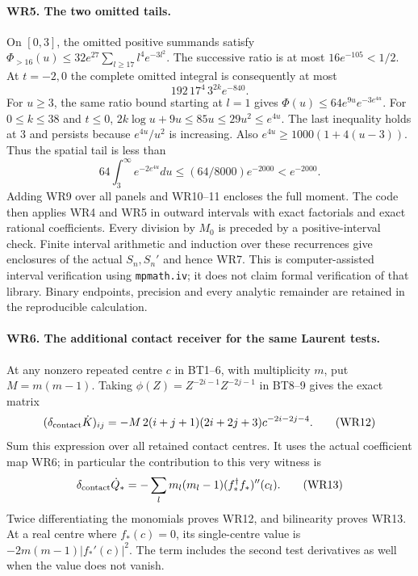 \documentclass[11pt,a4paper]{article}
\theoremstyle{definition}\newtheorem{definition}[theorem]{Definition}
\begin{document}
\paragraph{WR5. The two omitted tails.}
On $[0,3]$, the omitted positive summands satisfy
$\Phi_{>16}(u)\le32e^{27}\sum_{l\ge17}l^4e^{-3l^2}$.
The successive ratio is at most $16e^{-105}<1/2$. At $t=-2,0$
the complete omitted integral is consequently at most
\[
 192\,17^4\,3^{2k}e^{-840}.
 \tag{WR10}
\]
For $u\ge3$, the same ratio bound starting at $l=1$ gives
$\Phi(u)\le64e^{9u}e^{-3e^{4u}}$.
For $0\le k\le38$ and $t\le0$,
$2k\log u+9u\le85u\le29u^2\le e^{4u}$.
The last inequality holds at $3$ and persists because
$e^{4u}/u^2$ is increasing. Also
$e^{4u}\ge1000(1+4(u-3))$. Thus the spatial tail is less than
\[
 64\int_3^\infty e^{-2e^{4u}}du
 \le(64/8000)e^{-2000}<e^{-2000}.
 \tag{WR11}
\]
Adding WR9 over all panels and WR10--11 encloses the full
moment. The code then applies WR4 and WR5 in outward intervals
with exact factorials and exact rational coefficients. Every
division by $M_0$ is preceded by a positive-interval check.
Finite interval arithmetic and induction over these recurrences
give enclosures of the actual $S_n,S_n'$ and hence WR7.
This is computer-assisted interval verification using
\texttt{mpmath.iv}; it does not claim formal verification of
that library. Binary endpoints, precision and every analytic
remainder are retained in the reproducible calculation.

\paragraph{WR6. The additional contact receiver for the same Laurent tests.}
At any nonzero repeated centre $c$ in BT1--6, with multiplicity
$m$, put $M=m(m-1)$. Taking
$\phi(Z)=Z^{-2i-1}Z^{-2j-1}$ in BT8--9 gives the exact matrix
\[
 (\delta_{\rm contact}\dot K)_{ij}
 =-M\,2(i+j+1)(2i+2j+3)c^{-2i-2j-4}.
 \tag{WR12}
\]
Sum this expression over all retained contact centres. It uses
the actual coefficient map WR6; in particular the contribution
to this very witness is
\[
 \delta_{\rm contact}\dot Q_*=-\sum_l m_l(m_l-1)
               (f_*^\dagger f_*)''(c_l).
 \tag{WR13}
\]
Twice differentiating the monomials proves WR12, and bilinearity
proves WR13. At a real centre where $f_*(c)=0$, its single-centre
value is $-2m(m-1)|f_*'(c)|^2$. The term includes the second
test derivatives as well when the value does not vanish.
\end{document}
